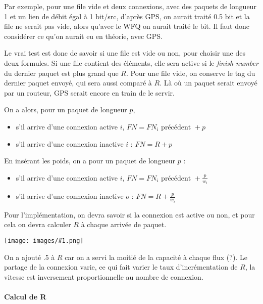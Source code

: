 \documentclass[10pt,a4paper]{report}
\newcommand{\dessin}[1]{\begin{center}\texttt{[image: images/\#1.png]}\end{center}}
\begin{document}
			Par exemple, pour une file vide et deux connexions, avec des paquets de longueur 1 et un lien de débit égal à 1 bit/src, d'après GPS, on aurait traité 0.5 bit et la file ne serait pas vide, alors qu'avec le WFQ on aurait traité le bit. Il faut donc considérer ce qu'on aurait eu en théorie, avec GPS.
			
			Le vrai test est donc de savoir si une file est vide ou non, pour choisir une des deux formules. Si une file contient des éléments, elle sera active si le \textit{finish number} du dernier paquet est plus grand que $R$. Pour une file vide, on conserve le tag du dernier paquet envoyé, qui sera aussi comparé à $R$. Là où un paquet serait envoyé par un routeur, GPS serait encore en train de le servir.
			
			On a alors, pour un paquet de longueur $p$,
			
			\begin{itemize}
				\item s'il arrive d'une connexion active $i$, $FN = FN_i \text{ précédent } + p$
				\item s'il arrive d'une connexion inactive $i$ : $FN = R + p$
			\end{itemize}
			
			En insérant les poids, on a pour un paquet de longueur $p$ :
			
			\begin{itemize}
				\item s'il arrive d'une connexion active $i$, $FN = FN_i \text{ précédent } + \frac{p}{w_i}$
				\item s'il arrive d'une connexion inactive $o$ : $FN = R + \frac{p}{w_i}$
			\end{itemize}
			
			Pour l'implémentation, on devra savoir si la connexion est active ou non, et pour cela on devra calculer $R$ à chaque arrivée de paquet.
								
			
			\dessin{98}
						
			On a ajouté .5 à $R$ car on a servi la moitié de la capacité à chaque flux (?). Le partage de la connexion varie, ce qui fait varier le taux d'incrémentation de $R$, la vitesse est inversement proportionnelle au nombre de connexion.
			
			
			
			\paragraph{Calcul de R}
			
\end{document}
